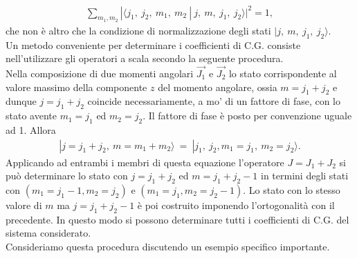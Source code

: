 \begin{align}
 \sum_{m_1, m_2} {|\langle j_1 ,~ j_2,~m_1, ~ m_2 ~|~ j ,~ m,~j_1, ~ j_2 \rangle|^2} =1 , 
\end{align}
che non è altro che la condizione di normalizzazione degli stati $| j ,~ m,~j_1, ~ j_2 \rangle $. \\
Un metodo conveniente per determinare i coefficienti di C.G. consiste nell'utilizzare gli operatori a scala secondo la seguente procedura. \\
Nella composizione di due momenti angolari $\vec{J_1}$ e  $\vec{J_2}$ lo stato corrispondente al valore massimo della componente $z$ del momento angolare, ossia $m= j_1+j_2$ e dunque $j=j_1+j_2$ coincide necessariamente, a mo' di un fattore di fase, con lo stato avente $m_1=j_1$ ed $m_2=j_2$. Il fattore di fase è posto per convenzione uguale ad 1. Allora
\begin{align}
| j= j_1 + j_2 ,~m= m_1 +m_2  \rangle ~= ~| j_1 ,~j_2,  m_1=j_1, ~m_2= j_2 \rangle .
\end{align}
Applicando ad entrambi i membri di questa equazione l'operatore $J=J_1+J_2$ si può determinare lo stato con $j=j_1+j_2$ ed $m=j_1+j_2-1$ in termini degli stati con $(m_1=j_1-1 , m_2=j_2)$ e $(m_1=j_1, m_2=j_2-1)$. Lo stato con lo stesso valore di $m$ ma $j=j_1+j_2-1$ è poi costruito imponendo l'ortogonalità con il precedente. In questo modo si possono determinare tutti i coefficienti di C.G. del sistema considerato. \\
Consideriamo questa procedura discutendo un esempio specifico importante.
